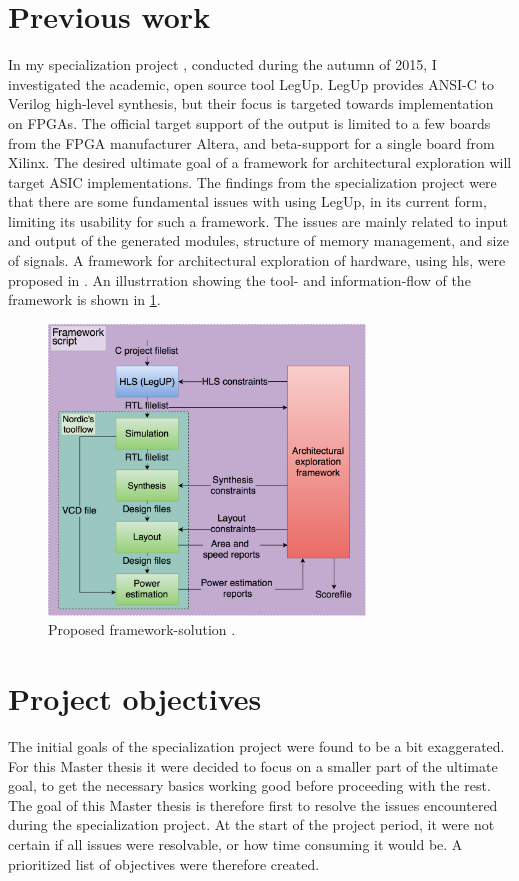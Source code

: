 \section{Previous work}
In my specialization project \cite{holm2015pro}, conducted during the autumn of 2015, I investigated the academic, open source tool LegUp. LegUp provides ANSI-C to Verilog high-level synthesis, but their focus is targeted towards implementation on FPGAs. The official target support of the output is limited to a few boards from the FPGA manufacturer Altera, and beta-support for a single board from Xilinx. The desired ultimate goal of a framework for architectural exploration will target ASIC implementations. The findings from the specialization project were that there are some fundamental issues with using LegUp, in its current form, limiting its usability for such a framework. The issues are mainly related to input and output of the generated modules, structure of memory management, and size of signals. A framework for architectural exploration of hardware, using \gls{hls}, were proposed in \cite{holm2015pro}. An illustrration showing the tool- and information-flow of the framework is shown in \cref{fig:frameworkflow}.

\begin{figure}[hbpt]
\centering
\includegraphics[width=0.75\textwidth]{../figs/Framework.png}
\caption{\label{fig:frameworkflow}Proposed framework-solution \cite{holm2015pro}.}
\end{figure}

\section{\label{sec:projectobj}Project objectives}
The initial goals of the specialization project were found to be a bit exaggerated. For this Master thesis it were decided to focus on a smaller part of the ultimate goal, to get the necessary basics working good before proceeding with the rest. The goal of this Master thesis is therefore first to resolve the issues encountered during the specialization project. At the start of the project period, it were not certain if all issues were resolvable, or how time consuming it would be. A prioritized list of objectives were therefore created.

